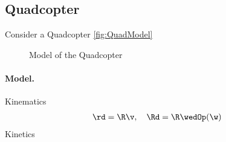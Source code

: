 \subsection{Quadcopter}
Consider a Quadcopter \autoref{fig:QuadModel}
\begin{figure}[ht]
 \centering
 
 \caption{Model of the Quadcopter}
 \label{fig:QuadModel}
\end{figure}

\paragraph{Model.}
Kinematics
\begin{align}\label{eq:QuadcopterKinematics}
 \rd = \R\v, \quad \Rd = \R\wedOp(\w)
\end{align}
Kinetics
